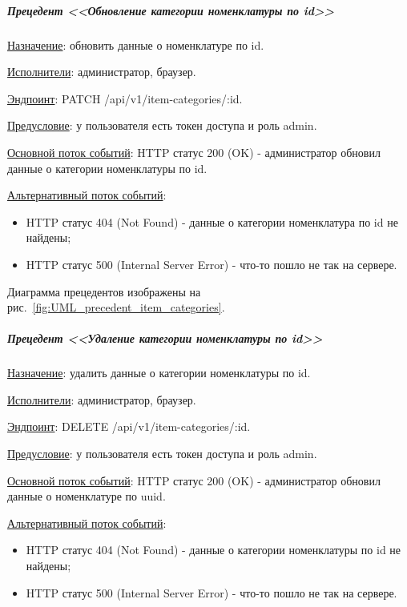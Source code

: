 
\subparagraph{Прецедент <<Обновление категории номенклатуры по id>>} \hspace{0pt}

\underline{Назначение}: обновить данные о номенклатуре по id.

\underline{Исполнители}: администратор, браузер.

\underline{Эндпоинт}: PATCH /api/v1/item-categories/:id.

\underline{Предусловие}: у пользователя есть токен доступа и роль admin.

\underline{Основной поток событий}: HTTP статус 200 (OK) - администратор обновил данные о категории номенклатуры по id. 

\underline{Альтернативный поток событий}:

\begin{itemize}
    \item HTTP статус 404 (Not Found) - данные о категории номенклатура по id не найдены;
    \item HTTP статус 500 (Internal Server Error) - что-то пошло не так на сервере.
\end{itemize}

Диаграмма прецедентов изображены на рис.~\ref{fig:UML_precedent_item_categories}.


\subparagraph{Прецедент <<Удаление категории номенклатуры по id>>} \hspace{0pt}

\underline{Назначение}: удалить данные о категории номенклатуры по id.

\underline{Исполнители}: администратор, браузер.

\underline{Эндпоинт}: DELETE /api/v1/item-categories/:id.

\underline{Предусловие}: у пользователя есть токен доступа и роль admin.

\underline{Основной поток событий}: HTTP статус 200 (OK) - администратор обновил данные о номенклатуре по uuid. 

\underline{Альтернативный поток событий}:

\begin{itemize}
    \item HTTP статус 404 (Not Found) - данные о категории номенклатуры по id не найдены;
    \item HTTP статус 500 (Internal Server Error) - что-то пошло не так на сервере.
\end{itemize}

